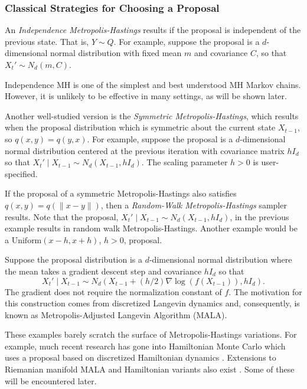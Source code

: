 \documentclass[12pt]{article}
\theoremstyle{plain}
\theoremstyle{definition}
\theoremstyle{remark}
\begin{document}
\subsubsection{Classical Strategies for Choosing a Proposal}
\label{mcmc:sec:choosing.proposal'}

An {\em Independence Metropolis-Hastings} results if the proposal is
independent of the previous state.  That is, $Y \sim Q$.   For
example, suppose the proposal is a $d$-dimensional normal distribution
with fixed mean $m$ and covariance $C$, so that  $X_t' \sim N_{d}(m,
C)$.

Independence MH is one of the simplest and best understood MH Markov
chains.  However, it is unlikely to be effective in many settings, as will be
shown later.

Another well-studied version is the {\em Symmetric
  Metropolis-Hastings}, which results when the proposal distribution
which is symmetric about the current state $X_{t-1}$, so
$q(x, y)=q(y, x)$. For example, suppose the proposal is a
  $d$-dimensional normal distribution centered at the previous
  iteration with covariance matrix $h I_d$ so that
  $X_t' \mid X_{t-1} \sim N_{d}(X_{t-1}, h I_d)$.  The scaling
  parameter $h > 0$ is user-specified.


If the proposal of a symmetric Metropolis-Hastings also satisfies
$q(x, y) = q(\|x-y\|)$, then a {\em Random-Walk Metropolis-Hastings}
sampler results.  Note that the proposal,
$X_t' \mid X_{t-1} \sim N_{d}(X_{t-1}, h I_d)$, in the previous
example results in random walk Metropolis-Hastings.  Another example
would be a $\text{Uniform}(x - h, x + h)$, $h >0$, proposal.


Suppose the proposal distribution is a $d$-dimensional normal
distribution where the mean takes a gradient descent step and
covariance $h I_d$ so that
\[
  X_t' \mid X_{t-1} \sim N_d (X_{t-1} + (h/2) \nabla \log(f(X_{t-1})), h I_d) .
\]
The gradient does not require the normalization constant of $f$.
The motivation for this construction comes from discretized Langevin
dynamics \citep{robe:1996} and, consequently, is known as
Metropolis-Adjusted Langevin Algorithm (MALA).

These examples barely scratch the surface of Metropolis-Hastings
variations.  For example, much recent research has gone into
Hamiltonian Monte Carlo which uses a proposal based on discretized
Hamiltonian dynamics \citep{neal:2011}.  Extensions to Riemanian
manifold MALA and Hamiltonian variants also exist
\citep{giro:cald:2011}.  Some of these will be encountered later.
\end{document}
